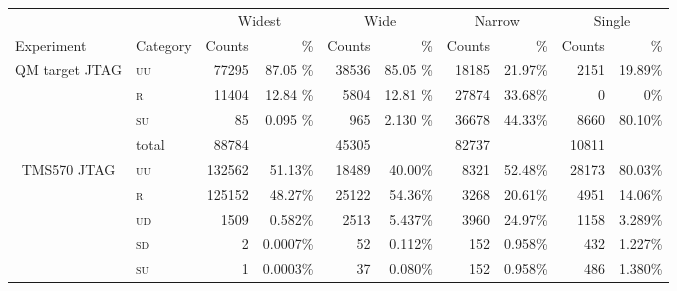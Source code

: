 \documentclass[10pt]{article}
\newcommand{\TI}{TMS570\xspace}
\newcommand{\NXP}{QM target\xspace}
\newcommand{\jtag}{JTAG\xspace}
\newcommand{\UU}{\textsc{uu}\xspace}
\newcommand{\UD}{\textsc{ud}\xspace}
\newcommand{\SU}{\textsc{su}\xspace}
\newcommand{\SD}{\textsc{sd}\xspace}
\newcommand{\R}{\textsc{r}\xspace}
\begin{document}
\begin{table}[H]
    \centering
    \begin{tabular}{ll rr rr rr rr}
    \toprule

      &  & \multicolumn{2}{c}{Widest }     &    
           \multicolumn{2}{c}{Wide }      &    
           \multicolumn{2}{c}{Narrow }   &
           \multicolumn{2}{c}{Single }  \\
      Experiment & \multicolumn{1}{c}{Category}  & 
      \multicolumn{1}{c}{Counts}      & \multicolumn{1}{r}{\%}          & 
      \multicolumn{1}{c}{Counts}      & \multicolumn{1}{r}{\%}          & 
      \multicolumn{1}{c}{Counts}      & \multicolumn{1}{r}{\%}          & 
      \multicolumn{1}{c}{Counts}      & \%         \\

    \midrule

    \multicolumn{1}{c}{\multirow{3}{*}{ \parbox{2cm}{\NXP \jtag}}}

    & \UU    
    & 77295  & 87.05 \%               
    & 38536  & 85.05 \%            
    & 18185  & 21.97\%              
    & 2151   & 19.89\%               
    \\
    & \R   
    & 11404  & 12.84 \%               
    & 5804   & 12.81 \%            
    & 27874  & 33.68\%              
    & 0   & 0\%               
    \\
    & \SU      
    & 85     & 0.095 \%               
    & 965    & 2.130 \%            
    & 36678  & 44.33\%              
    & 8660   & 80.10\%               
    \\

    & total    
    & 88784  &                        
    & 45305  &                     
    & 82737  &                        
    & 10811  &                        
    \\


    \midrule

    \multicolumn{1}{c}{\multirow{3}{*}{ \parbox{2cm}{\TI \jtag }}}
    & \UU    
    & 132562 & 51.13\%               
    & 18489   & 40.00\%            
    & 8321   & 52.48\%       
    & 28173  & 80.03\%             
    \\
    & \R   
    & 125152     & 48.27\%               
    & 25122   & 54.36\%            
    & 3268   & 20.61\%       
    & 4951   & 14.06\%             
    \\
    & \UD  
    & 1509       &  0.582\%                      
    & 2513    & 5.437\%            
    & 3960   & 24.97\%       
    & 1158   & 3.289\%             
    \\
    & \SD     
    & 2       &  0.0007\%                  
    & 52      & 0.112\%            
    & 152    & 0.958\%       
    & 432    & 1.227\%             
    \\
    & \SU      
    & 1      & 0.0003\%               
    & 37      & 0.080\%            
    & 152    & 0.958\%       
    & 486    & 1.380\%             
    \\


\end{tabular}
\end{table}
\end{document}
